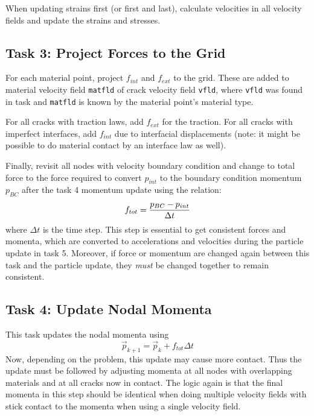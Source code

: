 \documentclass[11pt]{article}
\begin{document}
When updating strains first (or first and last), calculate velocities in all velocity fields and update the strains and stresses.

\subsection{Task 3: Project Forces to the Grid}

For each material point, project $f_{int}$ and $f_{ext}$ to the grid. These are added to material velocity field {\tt matfld} of crack velocity field {\tt vfld}, where {\tt vfld} was found in task  and {\tt matfld} is known by the material point's material type.

For all cracks with traction laws, add $f_{ext}$ for the traction. For all cracks with imperfect interfaces, add $f_{int}$ due to interfacial displacements (note: it might be possible to do material contact by an interface law as well).

Finally, revisit all nodes with velocity boundary condition and change to total force to the force required to convert $p_{int}$ to the boundary condition momentum $p_{BC}$ after the task 4 momentum update using the relation:
\begin{equation}
         f_{tot} = {p_{BC}-p_{int}\over \Delta t}
\end{equation}
where $\Delta t$ is the time step. This step is essential to get consistent forces and momenta, which are converted to accelerations and velocities during the particle update in task 5. Moreover, if force or momentum are changed again between this task and the particle update, they {\em must} be changed together to remain consistent.

\subsection{Task 4: Update Nodal Momenta}

This task updates the nodal momenta using
\begin{equation}
     \vec p_{k+1} = \vec p_k + f_{tot}\Delta t
\end{equation}
Now, depending on the problem, this update may cause more contact. Thus the update must be followed by adjusting momenta at all nodes with overlapping materials and at all cracks now in contact. The logic again is that the final momenta in this step should be identical when doing multiple velocity fields with stick contact to the momenta when using a single velocity field.
\end{document}
